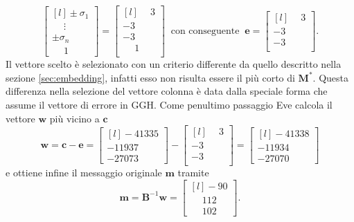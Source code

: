 \begin{exmp}
\begin{equation*}
    \begin{bmatrix*}[l]
        \pm\sigma_1 \\
        \phantom{\pm}\vdots \\
        \pm\sigma_n \\
        \phantom{\pm}1
    \end{bmatrix*}
    =
    \begin{bmatrix*}[l]
        \phantom{-}3\\[0.1cm]
                  -3\\[0.1cm]
                  -3\\[0.1cm]
        \phantom{-}1\\
    \end{bmatrix*}
    \ \text{ con conseguente } \
    \mathbf{e} =
    \begin{bmatrix*}[l]
        \phantom{-}3\\[0.1cm]
                  -3\\[0.1cm]
                  -3\\[0.1cm]
    \end{bmatrix*}.
\end{equation*}
Il vettore scelto è selezionato con un criterio differente da quello descritto nella sezione
\ref{sec:embedding}, infatti esso non risulta essere il più corto di $\mathbf{M}^*$. 
Questa differenza nella selezione del vettore colonna è data dalla speciale forma che assume 
il vettore di errore in GGH. 
Come penultimo passaggio Eve calcola il vettore $\mathbf{w}$ più vicino a $\mathbf{c}$
\begin{equation*}
    \mathbf{w} = \mathbf{c} - \mathbf{e} =
    \begin{bmatrix*}[l]
        -41335\\
        -11937\\
        -27073
    \end{bmatrix*} -
    \begin{bmatrix*}[l]
        \phantom{-}3\\
                  -3\\
                  -3\\
    \end{bmatrix*} =
    \begin{bmatrix*}[l]
        -41338\\
        -11934\\
        -27070
    \end{bmatrix*} 
\end{equation*}
e ottiene infine il messaggio originale $\mathbf{m}$ tramite
\begin{equation*}
    \mathbf{m} = \mathbf{B}^{-1} \mathbf{w} =
    \begin{bmatrix*}[l]
        -90\\
        \phantom{-}112\\
        \phantom{-}102
    \end{bmatrix*}.
\end{equation*}
\end{exmp}

